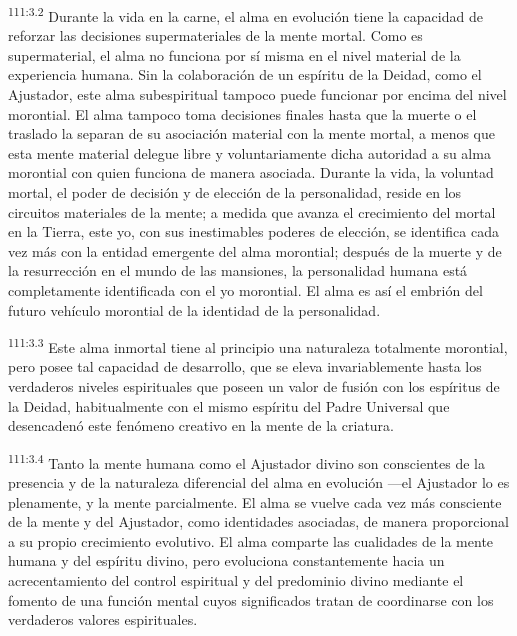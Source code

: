 \par
\textsuperscript{111:3.2} Durante la vida en la carne, el alma en evolución tiene la capacidad de reforzar las decisiones supermateriales de la mente mortal. Como es supermaterial, el alma no funciona por sí misma en el nivel material de la experiencia humana. Sin la colaboración de un espíritu de la Deidad, como el Ajustador, este alma subespiritual tampoco puede funcionar por encima del nivel morontial. El alma tampoco toma decisiones finales hasta que la muerte o el traslado la separan de su asociación material con la mente mortal, a menos que esta mente material delegue libre y voluntariamente dicha autoridad a su alma morontial con quien funciona de manera asociada. Durante la vida, la voluntad mortal, el poder de decisión y de elección de la personalidad, reside en los circuitos materiales de la mente; a medida que avanza el crecimiento del mortal en la Tierra, este yo, con sus inestimables poderes de elección, se identifica cada vez más con la entidad emergente del alma morontial; después de la muerte y de la resurrección en el mundo de las mansiones, la personalidad humana está completamente identificada con el yo morontial. El alma es así el embrión del futuro vehículo morontial de la identidad de la personalidad.

\par
\textsuperscript{111:3.3} Este alma inmortal tiene al principio una naturaleza totalmente morontial, pero posee tal capacidad de desarrollo, que se eleva invariablemente hasta los verdaderos niveles espirituales que poseen un valor de fusión con los espíritus de la Deidad, habitualmente con el mismo espíritu del Padre Universal que desencadenó este fenómeno creativo en la mente de la criatura.

\par
\textsuperscript{111:3.4} Tanto la mente humana como el Ajustador divino son conscientes de la presencia y de la naturaleza diferencial del alma en evolución ---el Ajustador lo es plenamente, y la mente parcialmente. El alma se vuelve cada vez más consciente de la mente y del Ajustador, como identidades asociadas, de manera proporcional a su propio crecimiento evolutivo. El alma comparte las cualidades de la mente humana y del espíritu divino, pero evoluciona constantemente hacia un acrecentamiento del control espiritual y del predominio divino mediante el fomento de una función mental cuyos significados tratan de coordinarse con los verdaderos valores espirituales.

